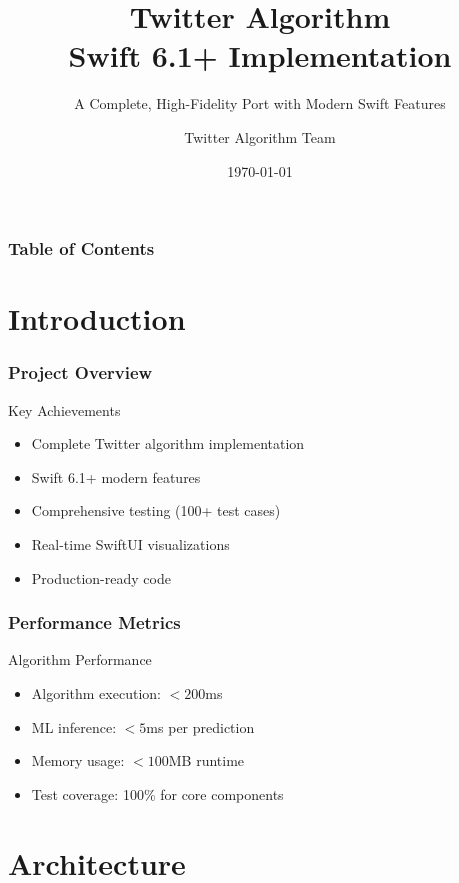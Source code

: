 \documentclass[aspectratio=169]{beamer}
\title[Twitter Algorithm Swift 6.1+]{Twitter Algorithm\\Swift 6.1+ Implementation}
\subtitle{A Complete, High-Fidelity Port with Modern Swift Features}
\author{Twitter Algorithm Team}
\institute{Swift 6.1+ Development}
\date{\today}
\begin{document}
\begin{frame}
    \titlepage
\end{frame}

\begin{frame}
    \frametitle{Table of Contents}
    \tableofcontents
\end{frame}

\section{Introduction}

\begin{frame}
    \frametitle{Project Overview}
    \begin{block}{Key Achievements}
        \begin{itemize}
            \item \checkmark Complete Twitter algorithm implementation
            \item \checkmark Swift 6.1+ modern features
            \item \checkmark Comprehensive testing (100+ test cases)
            \item \checkmark Real-time SwiftUI visualizations
            \item \checkmark Production-ready code
        \end{itemize}
    \end{block}
\end{frame}

\begin{frame}
    \frametitle{Performance Metrics}
    \begin{block}{Algorithm Performance}
        \begin{itemize}
            \item Algorithm execution: $< 200$ms
            \item ML inference: $< 5$ms per prediction
            \item Memory usage: $< 100$MB runtime
            \item Test coverage: 100\% for core components
        \end{itemize}
    \end{block}
\end{frame}

\section{Architecture}
\end{document}
